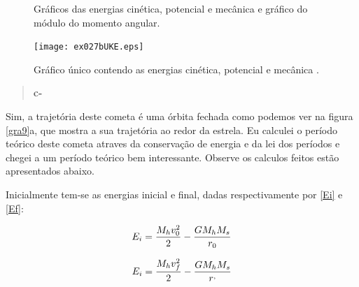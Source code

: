 \documentclass[a4wide]{report}
\begin{document}
\begin{figure}[!ht]
\qquad 
\caption{Gráficos das energias cinética, potencial e mecânica e gráfico do módulo do momento angular.}
\label{gra10}
\end{figure}

\begin{figure}[!ht]
\centering
\texttt{[image: ex027bUKE.eps]}
\caption{Gráfico único contendo as energias cinética, potencial e mecânica .}
\label{gra11}
\end{figure}

\newpage

\begin{quote}

\bf  c-

\end{quote}

Sim, a trajetória deste cometa é uma órbita fechada como podemos ver na figura \ref{gra9}a, que mostra a sua trajetória ao redor da estrela.
Eu calculei o período teórico deste cometa atraves da conservação de energia e da lei dos períodos e chegei a um período teórico bem interessante.
Observe os calculos feitos estão apresentados abaixo.

Inicialmente tem-se as energias inicial e final, dadas respectivamente por \ref{Ei} e \ref{Ef}:

\begin{equation}
\centering
E_{i} = \frac{M_{h}v_{0}^{2}}{2} - \frac{GM_{h}M_{s}}{r_{0}}
\label{Ei}
\end{equation}

\begin{equation}
\centering
E_{i} = \frac{M_{h}v_{f}^{2}}{2} - \frac{GM_{h}M_{s}}{r^{,}}
\label{Ef}
\end{equation}
\end{document}
